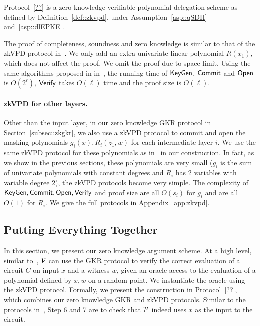 \begin{theorem}\label{thm:zkvpd}
	Protocol~\ref{??} is a zero-knowledge verifiable polynomial delegation scheme as defined by Definition~\ref{def::zkvpd}, under Assumption~\ref{asp::qSDH} and~\ref{asp::dlEPKE}.
\end{theorem}

The proof of completeness, soundness and zero knowledge is similar to that of the zkVPD protocol in~\cite{zkvpd}. We only add an extra univariate linear polynomial $R(x_1)$, which does not affect the proof. We omit the proof due to space limit. Using the same algorithms proposed in in~\cite{vram,zkvpd}, the running time of $\KeyGen$, $\Commit$ and $\Open$ is $O(2^\ell)$, $\Verify$ takes $O(\ell)$ time and the proof size is $O(\ell)$.

\paragraph{zkVPD for other layers.}
Other than the input layer, in our zero knowledge GKR protocol in Section~\ref{subsec::zkgkr}, we also use a zkVPD protocol to commit and open the masking polynomials $g_i(x), R_i(z_1, w)$ for each intermediate layer $i$. We use the same zkVPD protocol for these polynomials as in~\cite{zkvpd} in our construction. In fact, as we show in the previous sections, these polynomials are very small ($g_i$ is the sum of univariate polynomials with constant degrees and $R_i$ has 2 variables with variable degree 2), the zkVPD protocols become very simple. The complexity of $\KeyGen, \Commit, \Open, \Verify$ and proof size are all $O(s_i)$ for $g_i$ and are all $O(1)$ for $R_i$. We give the full protocols in Appendix~\ref{app:zkvpd}.


\subsection{Putting Everything Together}\label{subsec::zkall}

In this section, we present our zero knowledge argument scheme. At a high level, similar to~\cite{zhang2017vsql,wahby2018doubly,zkvpd}, $\V$ can use the GKR protocol to verify the correct evaluation of a circuit $C$ on input $x$ and a witness $w$, given an oracle access to the evaluation of a polynomial defined by $x,w$ on a random point. We instantiate the oracle using the zkVPD protocol. Formally, we present the construction in Protocol~\ref{??}, which combines our zero knowledge GKR and zkVPD protocols. Similar to the protocols in~\cite{zkvpd,hyrax}, Step 6 and 7 are to check that $\P$ indeed uses $x$ as the input to the circuit.

